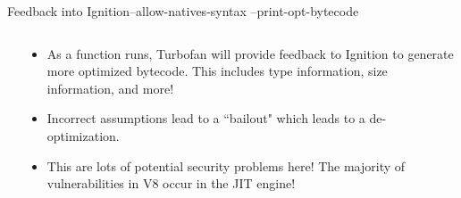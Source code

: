 \begin{frame}{Feedback into Ignition}{--allow-natives-syntax --print-opt-bytecode}
    \begin{columns}
        \begin{column}{0.5\textwidth}
            \inputminted{js}{code/ignition-feedback.tex}
        \end{column}
        \begin{column}{0.5\textwidth}
            \begin{itemize}
                \item  As a function runs, Turbofan will provide feedback to Ignition to generate more optimized bytecode. This includes type information, size information, and more! 
                \item Incorrect assumptions lead to a ``bailout" which leads to a de-optimization.
                \item This are lots of potential security problems here! The majority of vulnerabilities in V8 occur in the JIT engine!
            \end{itemize}
        \end{column}
    \end{columns}
\end{frame}

